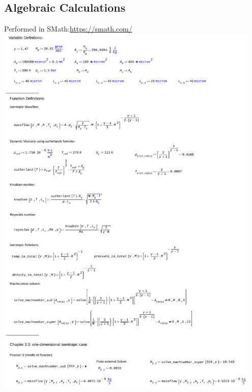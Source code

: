 \subsection{Algebraic Calculations}
\label{apx:smath}
Performed in SMath:\quad \url{https://smath.com/}\\

\includegraphics[page=1, width=0.95\textwidth]{code/calculations_thesis.pdf}
\newpage
